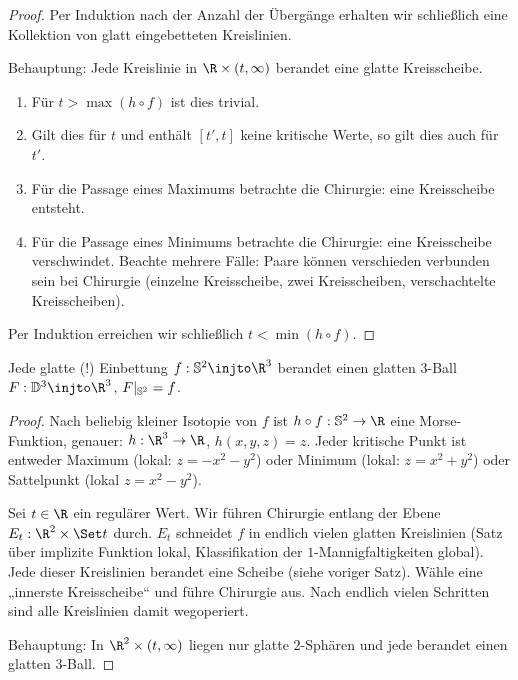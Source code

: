 \begin{st}
\begin{proof}
        Per Induktion nach der Anzahl der Übergänge erhalten wir schließlich eine Kollektion von glatt eingebetteten Kreislinien.

        Behauptung: Jede Kreislinie in $\R \times (t,\infty)$ berandet eine glatte Kreisscheibe.
        \begin{enumerate}[1),start=0]
            \item
                Für $t > \max(h \circ f)$ ist dies trivial.
            \item
                Gilt dies für $t$ und enthält $[t', t]$ keine kritische Werte, so gilt dies auch für $t'$.
            \item
                Für die Passage eines Maximums betrachte die Chirurgie: eine Kreisscheibe entsteht.
            \item
                Für die Passage eines Minimums betrachte die Chirurgie: eine Kreisscheibe verschwindet.
                Beachte mehrere Fälle: Paare können verschieden verbunden sein bei Chirurgie (einzelne Kreisscheibe, zwei Kreisscheiben, verschachtelte Kreisscheiben).
        \end{enumerate}
        Per Induktion erreichen wir schließlich $t < \min(h \circ f)$.
    \end{proof}
\end{st}

\begin{st}
    Jede glatte (!) Einbettung $f: \S^2 \injto \R^3$ berandet einen glatten $3$-Ball $F: \D^3 \injto \R^3$, $F|_{\S^2} = f$.
    \begin{proof}
        Nach beliebig kleiner Isotopie von $f$ ist $h \circ f: \S^2 \to \R$ eine Morse-Funktion, genauer: $h: \R^3 \to \R$, $h(x,y,z) = z$.
        Jeder kritische Punkt ist entweder Maximum (lokal: $z = -x^2-y^2$) oder Minimum (lokal: $z = x^2 + y^2$) oder Sattelpunkt (lokal $z = x^2 - y^2$).

        Sei $t \in \R$ ein regulärer Wert.
        Wir führen Chirurgie entlang der Ebene $E_t: \R^2 \times \Set t$ durch.
        $E_t$ schneidet $f$ in endlich vielen glatten Kreislinien (Satz über implizite Funktion lokal, Klassifikation der $1$-Mannigfaltigkeiten global).
        Jede dieser Kreislinien berandet eine Scheibe (siehe voriger Satz).
        Wähle eine „innerste Kreisscheibe“ und führe Chirurgie aus.
        Nach endlich vielen Schritten sind alle Kreislinien damit wegoperiert.

        Behauptung: In $\R^2 \times (t,\infty)$ liegen nur glatte $2$-Sphären und jede berandet einen glatten $3$-Ball.
                
    \end{proof}
\end{st}
